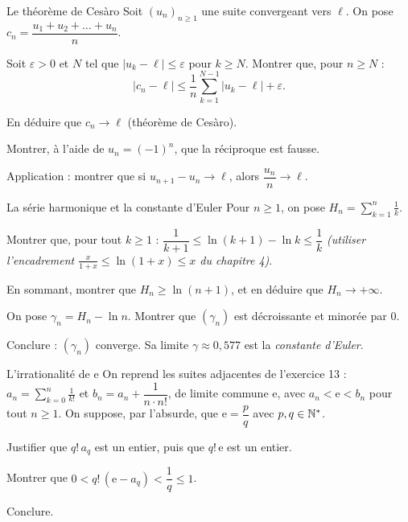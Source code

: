 \begin{exercice}[3]{Le théorème de Cesàro}
Soit $(u_n)_{n\geq1}$ une suite convergeant vers $\ell$. On pose
$c_n=\dfrac{u_1+u_2+\dots+u_n}{n}$.
\begin{questions}
  \item Soit $\varepsilon>0$ et $N$ tel que $|u_k-\ell|\leq\varepsilon$ pour
    $k\geq N$. Montrer que, pour $n\geq N$ :
    \[
      |c_n-\ell|\leq\frac{1}{n}\sum_{k=1}^{N-1}|u_k-\ell|+\varepsilon.
    \]
  \item En déduire que $c_n\to\ell$ (théorème de Cesàro).
  \item Montrer, à l'aide de $u_n=(-1)^{n}$, que la réciproque est fausse.
  \item Application : montrer que si $u_{n+1}-u_n\to\ell$, alors
    $\dfrac{u_n}{n}\to\ell$.
\end{questions}
\end{exercice}

\begin{exercice}[3]{La série harmonique et la constante d'Euler}
Pour $n\geq1$, on pose $H_n=\displaystyle\sum_{k=1}^{n}\frac1k$.
\begin{questions}
  \item Montrer que, pour tout $k\geq1$ :
    $\dfrac{1}{k+1}\leq\ln(k+1)-\ln k\leq\dfrac1k$
    \emph{(utiliser l'encadrement $\frac{x}{1+x}\leq\ln(1+x)\leq x$ du
    chapitre 4)}.
  \item En sommant, montrer que $H_n\geq\ln(n+1)$, et en déduire que
    $H_n\to+\infty$.
  \item On pose $\gamma_n=H_n-\ln n$. Montrer que $(\gamma_n)$ est
    décroissante et minorée par $0$.
  \item Conclure : $(\gamma_n)$ converge. Sa limite $\gamma\approx0{,}577$
    est la \emph{constante d'Euler}.
\end{questions}
\end{exercice}

\begin{exercice}[3]{L'irrationalité de e}
On reprend les suites adjacentes de l'exercice 13 :
$a_n=\displaystyle\sum_{k=0}^{n}\frac{1}{k!}$ et $b_n=a_n+\dfrac{1}{n\cdot n!}$, de
limite commune $\mathrm{e}$, avec $a_n<\mathrm{e}<b_n$ pour tout $n\geq1$.
On suppose, par l'absurde, que $\mathrm{e}=\dfrac{p}{q}$ avec
$p,q\in\mathbb{N}^{*}$.
\begin{questions}
  \item Justifier que $q!\,a_q$ est un entier, puis que $q!\,\mathrm{e}$ est
    un entier.
  \item Montrer que $0<q!\,(\mathrm{e}-a_q)<\dfrac1q\leq1$.
  \item Conclure.
\end{questions}
\end{exercice}

